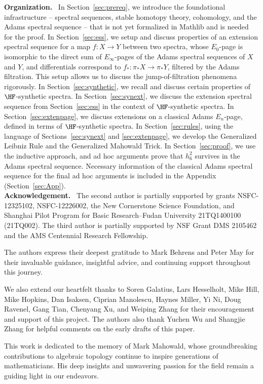 \noindent\textbf{Organization.} \ In Section~\ref{sec:prereq}, we introduce the foundational infrastructure -- spectral sequences, stable homotopy theory, cohomology, and the Adams spectral sequence -- that is not yet formalized in Mathlib and is needed for the proof. In Section~\ref{sec:ess}, we setup and discuss properties of an extension spectral sequence for a map $f: X\to Y$ between two spectra, whose $E_0$-page is isomorphic to the direct sum of $E_\infty$-pages of the Adams spectral sequences of $X$ and $Y$, and differentials correspond to $f_*: \pi_*X \to \pi_*Y$, filtered by the Adams filtration. This setup allows us to discuss the jump-of-filtration phenomena rigorously. In Section~\ref{sec:synthetic}, we recall and discuss certain properties of $\HF$-synthetic spectra. In Section~\ref{sec:synext}, we discuss the extension spectral sequence from Section~\ref{sec:ess} in the context of $\HF$-synthetic spectra. In Section~\ref{sec:extenpage}, we discuss extensions on a classical Adams $E_n$-page, defined in terms of $\HF$-synthetic spectra. In Section~\ref{sec:rules}, using the language of Sections~\ref{sec:synext} and \ref{sec:extenpage}, we develop the Generalized Leibniz Rule and the Generalized Mahowald Trick. In Section~\ref{sec:proof}, we use the inductive approach, and ad hoc arguments prove that $h_6^2$ survives in the Adams spectral sequence. Necessary information of the classical Adams spectral sequence for the final ad hoc arguments is included in the Appendix (Section~\ref{sec:App}).\\

\noindent\textbf{Acknowledgement.} \ The second author is partially supported by grants NSFC-12325102, NSFC-12226002, the New Cornerstone Science Foundation, and Shanghai Pilot Program for Basic Research–Fudan University 21TQ1400100 (21TQ002). The third author is partially supported by NSF Grant DMS 2105462 and the AMS Centennial Research Fellowship. 

The authors express their deepest gratitude to Mark Behrens and Peter May for their invaluable guidance, insightful advice, and continuing support throughout this journey.

We also extend our heartfelt thanks to Soren Galatius, Lars Hesselholt, Mike Hill, Mike Hopkins, Dan Isaksen, Ciprian Manolescu, Haynes Miller, Yi Ni, Doug Ravenel, Gang Tian, Chenyang Xu, and Weiping Zhang for their encouragement and support of this project. The authors also thank Yuchen Wu and Shangjie Zhang for helpful comments on the early drafts of this paper. 

This work is dedicated to the memory of Mark Mahowald, whose groundbreaking contributions to algebraic topology continue to inspire generations of mathematicians. His deep insights and unwavering passion for the field remain a guiding light in our endeavors.

